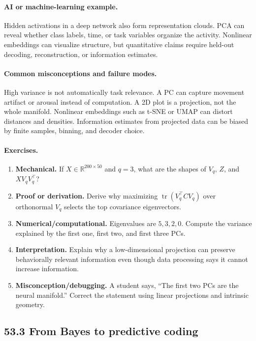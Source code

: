 \paragraph{AI or machine-learning example.}
Hidden activations in a deep network also form representation clouds. PCA can reveal whether class labels, time, or task variables organize the activity. Nonlinear embeddings can visualize structure, but quantitative claims require held-out decoding, reconstruction, or information estimates.

\paragraph{Common misconceptions and failure modes.}
High variance is not automatically task relevance. A PC can capture movement artifact or arousal instead of computation. A 2D plot is a projection, not the whole manifold. Nonlinear embeddings such as t-SNE or UMAP can distort distances and densities. Information estimates from projected data can be biased by finite samples, binning, and decoder choice.

\paragraph{Exercises.}
\begin{enumerate}[label=\textbf{53.2.\arabic*.}, leftmargin=*]
\item \textbf{Mechanical.} If \(X\in\mathbb R^{200\times 50}\) and \(q=3\), what are the shapes of \(V_q\), \(Z\), and \(XV_qV_q^\top\)?
\item \textbf{Proof or derivation.} Derive why maximizing \(\operatorname{tr}(V_q^\top C V_q)\) over orthonormal \(V_q\) selects the top covariance eigenvectors.
\item \textbf{Numerical/computational.} Eigenvalues are \(5,3,2,0\). Compute the variance explained by the first one, first two, and first three PCs.
\item \textbf{Interpretation.} Explain why a low-dimensional projection can preserve behaviorally relevant information even though data processing says it cannot increase information.
\item \textbf{Misconception/debugging.} A student says, ``The first two PCs are the neural manifold.'' Correct the statement using linear projections and intrinsic geometry.
\end{enumerate}

\subsection{53.3 From Bayes to predictive coding}


